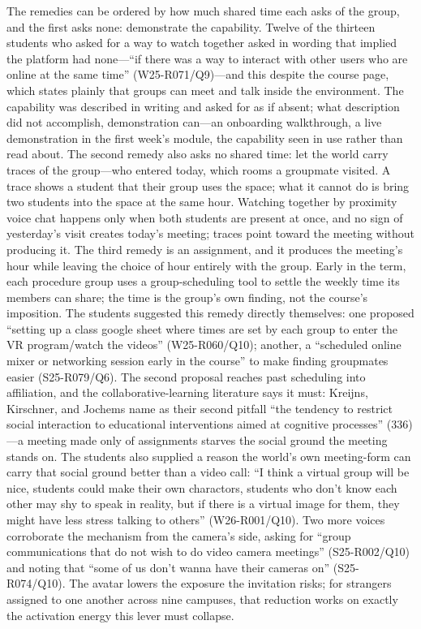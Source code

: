 The remedies can be ordered by how much shared time each asks of the
group, and the first asks none: demonstrate the capability. Twelve of
the thirteen students who asked for a way to watch together asked in
wording that implied the platform had none---``if there was a way to
interact with other users who are online at the same time''
(W25-R071/Q9)---and this despite the course page, which states plainly
that groups can meet and talk inside the environment. The capability
was described in writing and asked for as if absent; what description
did not accomplish, demonstration can---an onboarding walkthrough, a
live demonstration in the first week's module, the capability seen in
use rather than read about. The second remedy also asks no shared
time: let the world carry traces of the group---who entered today,
which rooms a groupmate visited. A trace shows a student that their
group uses the space; what it cannot do is bring two students into the
space at the same hour. Watching together by proximity voice chat happens
only when both students are present at once, and no sign of
yesterday's visit creates today's meeting; traces point toward the
meeting without producing it. The third remedy is an assignment, and
it produces the meeting's hour while leaving the choice of hour
entirely with the group. Early in the term, each procedure group uses
a group-scheduling tool to settle the weekly time its members can
share; the time is the group's own finding, not the course's
imposition. The students suggested this remedy directly themselves:
one proposed ``setting up a class google sheet where times are set by
each group to enter the VR program/watch the videos'' (W25-R060/Q10);
another, a ``scheduled online mixer or networking session early in the
course'' to make finding groupmates easier (S25-R079/Q6). The second
proposal reaches past scheduling into affiliation, and the
collaborative-learning literature says it must: Kreijns, Kirschner,
and Jochems name as their second pitfall ``the tendency to restrict
social interaction to educational interventions aimed at cognitive
processes'' (336)---a meeting made only of assignments starves the
social ground the meeting stands on. The students also supplied a reason
the world's own meeting-form can carry that social ground better than a
video call: ``I think a virtual group will be nice, students could make
their own charactors, students who don't know each other may shy to speak
in reality, but if there is a virtual image for them, they might have
less stress talking to others'' (W26-R001/Q10). Two more voices
corroborate the mechanism from the camera's side, asking for ``group
communications that do not wish to do video camera meetings''
(S25-R002/Q10) and noting that ``some of us don’t wanna have their
cameras on'' (S25-R074/Q10). The avatar lowers the exposure the
invitation risks; for strangers assigned to one another across nine
campuses, that reduction works on exactly the activation energy this
lever must collapse.

